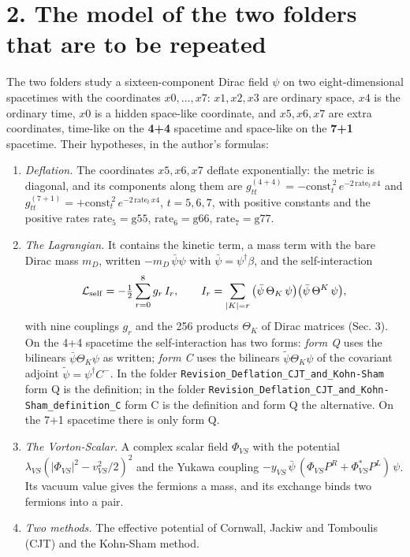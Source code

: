 \documentclass[
  10pt,
]{article}
\providecommand{\tightlist}{%
  \setlength{\itemsep}{0pt}\setlength{\parskip}{0pt}}
\begin{document}
\hypertarget{the-model-of-the-two-folders-that-are-to-be-repeated}{%
\section{2. The model of the two folders that are to be
repeated}\label{the-model-of-the-two-folders-that-are-to-be-repeated}}

The two folders study a sixteen-component Dirac field \(\psi\) on two
eight-dimensional spacetimes with the coordinates \(x0,\dots,x7\):
\(x1,x2,x3\) are ordinary space, \(x4\) is the ordinary time, \(x0\) is
a hidden space-like coordinate, and \(x5,x6,x7\) are extra coordinates,
time-like on the \textbf{4+4} spacetime and space-like on the
\textbf{7+1} spacetime. Their hypotheses, in the author's formulas:

\begin{enumerate}
\def\labelenumi{\arabic{enumi}.}
\tightlist
\item
  \emph{Deflation.} The coordinates \(x5,x6,x7\) deflate exponentially:
  the metric is diagonal, and its components along them are
  \(g^{(4+4)}_{tt}=-\mathrm{const}_t^{\,2}\,e^{-2\,\mathrm{rate}_t\,x4}\)
  and
  \(g^{(7+1)}_{tt}=+\mathrm{const}_t^{\,2}\,e^{-2\,\mathrm{rate}_t\,x4}\),
  \(t=5,6,7\), with positive constants and the positive rates
  \(\mathrm{rate}_5=\mathrm{g55}\), \(\mathrm{rate}_6=\mathrm{g66}\),
  \(\mathrm{rate}_7=\mathrm{g77}\).
\item
  \emph{The Lagrangian.} It contains the kinetic term, a mass term with
  the bare Dirac mass \(m_D\), written \(-m_D\,\bar\psi\psi\) with
  \(\bar\psi=\psi^\dagger\beta\), and the self-interaction
  \[\mathcal L_{\rm self}=-\tfrac12\sum_{r=0}^{8}g_r\,I_r,\qquad
  I_r=\sum_{|K|=r}\big(\bar\psi\,\Theta_K\,\psi\big)\big(\bar\psi\,\Theta^K\,\psi\big),\]
  with nine couplings \(g_r\) and the 256 products \(\Theta_K\) of Dirac
  matrices (Sec. 3). On the 4+4 spacetime the self-interaction has two
  forms: \emph{form Q} uses the bilinears \(\bar\psi\Theta_K\psi\) as
  written; \emph{form C} uses the bilinears \(\tilde\psi\Theta_K\psi\)
  of the covariant adjoint \(\tilde\psi=\psi^\dagger C^-\). In the
  folder \texttt{Revision\_Deflation\_CJT\_and\_Kohn-Sham} form Q is the
  definition; in the folder
  \texttt{Revision\_Deflation\_CJT\_and\_Kohn-Sham\_definition\_C} form
  C is the definition and form Q the alternative. On the 7+1 spacetime
  there is only form Q.
\item
  \emph{The Vorton-Scalar.} A complex scalar field \(\Phi_{VS}\) with
  the potential \(\lambda_{VS}(|\Phi_{VS}|^2-v_{VS}^2/2)^2\) and the
  Yukawa coupling
  \(-y_{VS}\,\bar\psi\,(\Phi_{VS}P^R+\Phi_{VS}^{*}P^L)\,\psi\). Its
  vacuum value gives the fermions a mass, and its exchange binds two
  fermions into a pair.
\item
  \emph{Two methods.} The effective potential of Cornwall, Jackiw and
  Tomboulis (CJT) and the Kohn-Sham method.
\end{enumerate}
\end{document}
